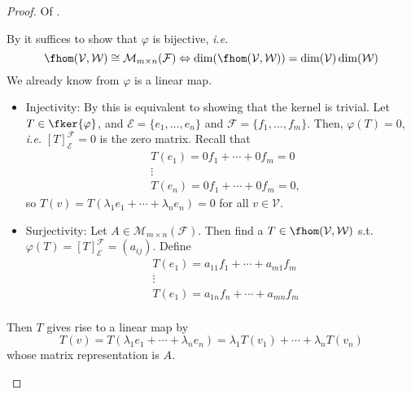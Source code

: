\begin{proof}
	Of .
	\begin{flushleft}
		By  it suffices to show that
		$\varphi$ is bijective, \textit{i.e.}
		\begin{equation}\label{eq-hom-linear-maps-equivalency}
			\fhom(\mathcal{V},\mathcal{W})\cong\mathcal{M}_{m \times n}(\mathcal{F})
			\Leftrightarrow \dim(\fhom(\mathcal{V},\mathcal{W}))=\dim(\mathcal{V})\dim(\mathcal{W})
		\end{equation}
		We already know from  $\varphi$
		is a linear map.
		\begin{itemize}
			\item Injectivity: By  this
			      is equivalent to showing that the kernel is trivial. Let $T\in\fker{\varphi}$,
			      and $\mathcal{E}=\{e_1,\dots,e_n\}$ and $\mathcal{F}=\{f_1,\dots,f_m\}$.
			      Then, $\varphi(T)=0$, \textit{i.e.} $[T]_\mathcal{E}^\mathcal{F}=0$ is the zero
			      matrix. Recall that
			      \begin{align*}
				       & T(e_1) = 0f_1+\cdots+0f_m = 0  \\
				       & \vdots                         \\
				       & T(e_n) = 0f_1+\cdots+0f_m = 0,
			      \end{align*}
			      so $T(v)=T(\lambda_1e_1+\cdots+\lambda_ne_n)=0$ for all $v\in\mathcal{V}$.
			\item Surjectivity: Let $A\in\mathcal{M}_{m \times n}(\mathcal{F})$. Then
			      find a $T\in\fhom(\mathcal{V},\mathcal{W})$ s.t. $\varphi(T)=[T]_\mathcal{E}^\mathcal{F}=(a_{ij})$.
			      Define
			      \begin{align*}
				       & T(e_1)=a_{11}f_1+\cdots+a_{m1}f_m \\
				       & \vdots                            \\
				       & T(e_1)=a_{1n}f_n+\cdots+a_{mn}f_m \\
			      \end{align*}
		\end{itemize}
		Then $T$ gives rise to a linear map by
		\begin{equation*}
			T(v)=T(\lambda_1e_1+\cdots+\lambda_ne_n)=\lambda_1T(v_1)+\cdots+\lambda_n T(v_n)
		\end{equation*}
		whose matrix representation is $A$.
	\end{flushleft}
\end{proof}
